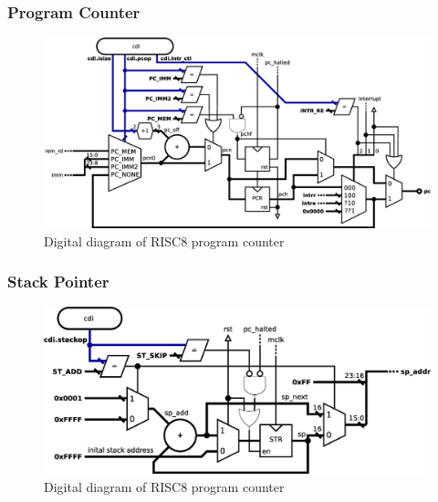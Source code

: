 \documentclass[a4paper,12pt]{article}
\begin{document}
\subsubsection{Program Counter}
\begin{figure}[h!]
	\centering
	\includegraphics[width=\linewidth]{graphics/program_counter.eps}
	\caption{Digital diagram of RISC8 program counter}
	\label{fig:program_counter}
\end{figure}


\subsubsection{Stack Pointer}
\begin{figure}
	\centering
	\includegraphics[width=\linewidth]{graphics/stack_diagram.eps}
	\caption{Digital diagram of RISC8 program counter}
	\label{fig:stack_pointer}
\end{figure}
\end{document}
